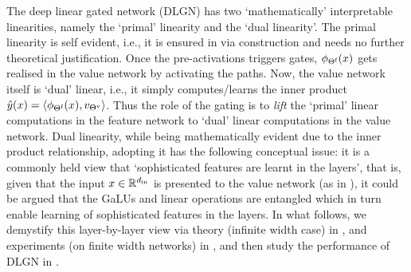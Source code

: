 The deep linear gated network (DLGN) has two `mathematically' interpretable linearities, namely the `primal' linearity and the `dual linearity'. The primal linearity is self evident, i.e., it is ensured in via construction and needs no further theoretical justification. Once the pre-activations triggers gates, $\phi_{\Theta^{\textrm{f}}}(x)$ gets realised in the value network by activating the paths.  Now, the value network itself is `dual' linear, i.e., it simply computes/learns the inner product $\hat{y}(x)=\langle \phi_{\Theta^{\textrm{f}}}(x),v_{{\Theta}^{\text{v}}}\rangle$. Thus the role of the gating is to \emph{lift} the `primal' linear computations in the feature network to `dual' linear computations in the value network. Dual linearity, while being mathematically evident due to the inner product relationship, adopting it has the following conceptual issue: it is a commonly held view that `sophisticated features are learnt in the layers', that is, given that the input $x\in\mathbb{R}^{d_{\text{in}}}$  is presented to the value network (as in ), it could be argued that the GaLUs and linear operations are entangled which in turn enable learning of sophisticated features in the layers. In what follows, we demystify this layer-by-layer view via theory (infinite width case) in  , and experiments (on finite width networks) in , and then study the performance of DLGN in . 

